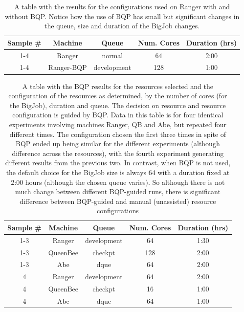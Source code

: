 \documentclass[conference,final]{IEEEtran}
\begin{document}
\begin{table}
\begin{tabular}{|c|c|c|c|c|}
\hline Sample \# & Machine & Queue & Num. Cores & Duration (hrs) \\ 
\hline 1-4& Ranger & normal & 64 & 2:00 \\ 
\hline 1-4& Ranger-BQP & development & 128 & 1:00 \\ 
\hline 
\end{tabular} 
\caption{A table with the results for the configurations used
  on Ranger with and without BQP. Notice how the use
  of BQP has small but significant changes in the queue, size and duration
  of the BigJob changes. }
\end{table}


\begin{table}
\begin{tabular}{|c|c|c|c|c|}
\hline Sample \# & Machine & Queue & Num. Cores & Duration (hrs) \\ 
\hline 1-3 & Ranger & development & 64 & 1:30 \\ 
\hline 1-3 & QueenBee & checkpt & 128 & 2:00 \\ 
\hline 1-3 & Abe & dque & 64 & 2:00 \\ 
\hline 4 & Ranger & development & 64 & 2:00 \\ 
\hline 4 & QueenBee & checkpt & 16 & 1:00 \\ 
\hline 4 & Abe & dque & 64 & 1:00 \\ 
\hline 
\end{tabular} 
\caption{
  A table with the BQP results for the resources selected and 
  the configuration of the resources as determined, by the
  number of cores (for the BigJob), duration and queue.
  The decision on resource and resource configuration is guided by BQP.
  Data in this table is for four identical experiments involving
  machines Ranger, QB and Abe, but repeated
  four different times. The configuration chosen the first three times
  in spite of BQP ended up being similar for the different 
  experiments (although difference across the resources), 
  with the fourth experiment generating different results from the previous two. In contrast, when BQP is not used, 
  the default choice for the BigJob size is always 64 with a duration fixed
  at 2:00 hours (although the chosen queue varies). So although there is not 
  much change between different BQP-guided runs,  there is significant
  difference between BQP-guided and manual (unassisted) resource configurations
}
\end{table}
\end{document}
